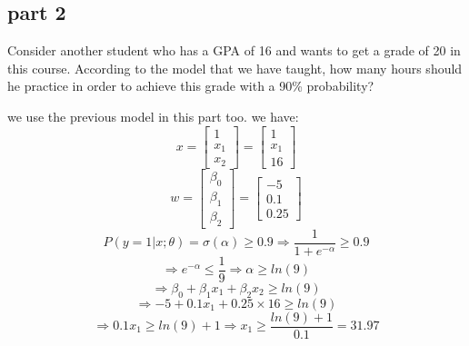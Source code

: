 \subsection{part 2}
Consider another student who has a GPA of 16 and wants to get a grade of 20 in this course. According to the model that we have taught, how many hours should he practice in order to achieve this grade with a 90\% probability?
\begin{qsolve}
    \begin{qsolve}[]
        we use the previous model in this part too. we have:
        $$x = \begin{bmatrix} 1 \\ x_1 \\ x_2 \end{bmatrix} = \begin{bmatrix} 1 \\ x_1 \\ 16 \end{bmatrix}$$
        $$w = \begin{bmatrix} \beta_0 \\ \beta_1 \\ \beta_2 \end{bmatrix} = \begin{bmatrix} -5 \\ 0.1 \\ 0.25 \end{bmatrix}$$
        $$P(y=1|x;\theta) = \sigma(\alpha) \geq 0.9 \Rightarrow \frac{1}{1+e^{-\alpha}} \geq 0.9$$
        $$\Rightarrow e^{-\alpha} \leq \frac{1}{9} \Rightarrow \alpha \geq ln(9) $$
        $$\Rightarrow \beta_0 + \beta_1 x_1 + \beta_2 x_2 \geq ln(9)$$
        $$\Rightarrow -5 + 0.1 x_1 + 0.25 \times 16 \geq ln(9)$$
        $$\Rightarrow 0.1 x_1 \geq ln(9) + 1 \Rightarrow x_1 \geq \frac{ln(9) + 1}{0.1} = 31.97$$
    \end{qsolve}
\end{qsolve}
